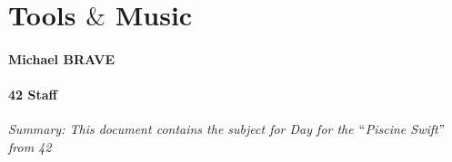 \documentclass[12pt]{report}
\begin{document}
\vspace{\baselineskip}

\vspace{\baselineskip}

\vspace{\baselineskip}

\vspace{\baselineskip}

\vspace{\baselineskip}
\par

\section*{Tools $\&$  Music}

\vspace{\baselineskip}

\vspace{\baselineskip}
\paragraph*{Michael BRAVE }
\paragraph*{42 Staff }

\vspace{\baselineskip}

\vspace{\baselineskip}

\vspace{\baselineskip}

\vspace{\baselineskip}
\begin{Center}
\textit{Summary: This document contains the subject for Day for the $``$Piscine Swift$"$  from 42}
\end{Center}\par


\vspace{\baselineskip}

\vspace{\baselineskip}

\vspace{\baselineskip}

\vspace{\baselineskip}
\end{document}
